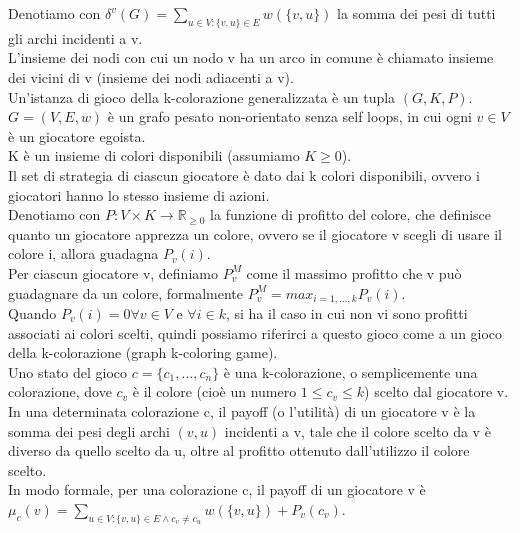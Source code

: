 Denotiamo con \(\delta^v (G) = \sum_{u \in V : \{v, u\} \in E} w(\{v, u\})\) la somma dei pesi di tutti gli archi incidenti a v.\\

L'insieme dei nodi con cui un nodo v ha un arco in comune è chiamato insieme dei vicini di v (insieme dei nodi adiacenti a v).\\

Un'istanza di gioco della k-colorazione generalizzata è un tupla \((G, K, P)\). \(G = (V, E, w)\) è un grafo pesato non-orientato senza self loops, in cui ogni \(v \in V\) è un giocatore egoista.\\

K è un insieme di colori disponibili (assumiamo \(K \geq 0\)).\\

Il set di strategia di ciascun giocatore è dato dai k colori disponibili, ovvero i giocatori hanno lo stesso insieme di azioni.\\

Denotiamo con \(P : V \times K \rightarrow \mathds{R}_{\geq 0}\) la funzione di profitto del colore, che definisce quanto un giocatore apprezza un colore, ovvero se il giocatore v scegli di usare il colore i, allora guadagna \(P_v (i)\).\\

Per ciascun giocatore v, definiamo \(P_v^M\) come il massimo profitto che v può guadagnare da un colore, formalmente \(P_v^M = max_{i=1,\ldots,k} P_v (i)\).\\

Quando \(P_v (i) = 0 \forall v \in V\) e \(\forall i \in k\), si ha il caso in cui non vi sono profitti associati ai colori scelti, quindi possiamo riferirci a questo gioco come a un gioco della k-colorazione (graph k-coloring game).\\

Uno stato del gioco \(c = \{c_1,\ldots,c_n\}\) è una k-colorazione, o semplicemente una colorazione, dove \(c_v\) è il colore (cioè un numero \(1 \leq c_v \leq k\)) scelto dal giocatore v.\\

In una determinata colorazione c, il payoff (o l'utilità) di un giocatore v è la somma dei pesi degli archi \((v, u)\) incidenti a v, tale che il colore scelto da v è diverso da quello scelto da u, oltre al profitto ottenuto dall'utilizzo il colore scelto.\\

In modo formale, per una colorazione c, il payoff di un giocatore v è \(\mu_c (v) = \sum_{u \in V:\{v, u\} \in E \wedge c_v \neq c_u} w(\{v, u\}) + P_v(c_v)\).\\

